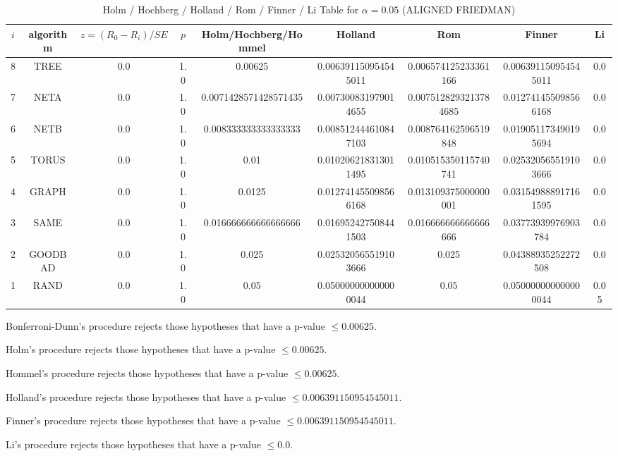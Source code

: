 \documentclass[a4paper,10pt]{article}
\begin{document}
\begin{landscape}
\begin{table}[!htp]
\centering\scriptsize
\caption{Holm / Hochberg / Holland / Rom / Finner / Li Table for $\alpha=0.05$ (ALIGNED FRIEDMAN)}
\begin{tabular}{ccccccccc}
$i$&algorithm&$z=(R_0 - R_i)/SE$&$p$&Holm/Hochberg/Hommel&Holland&Rom&Finner&Li\\
\hline
8& TREE&0.0&1.0&0.00625&0.006391150954545011&0.006574125233361166&0.006391150954545011&0.0\\
7& NETA&0.0&1.0&0.0071428571428571435&0.007300831979014655&0.0075128293213784685&0.012741455098566168&0.0\\
6& NETB&0.0&1.0&0.008333333333333333&0.008512444610847103&0.008764162596519848&0.019051173490195694&0.0\\
5& TORUS&0.0&1.0&0.01&0.010206218313011495&0.010515350115740741&0.025320565519103666&0.0\\
4& GRAPH&0.0&1.0&0.0125&0.012741455098566168&0.013109375000000001&0.031549888917161595&0.0\\
3& SAME&0.0&1.0&0.016666666666666666&0.016952427508441503&0.016666666666666666&0.03773939976903784&0.0\\
2& GOODBAD&0.0&1.0&0.025&0.025320565519103666&0.025&0.04388935252272508&0.0\\
1& RAND&0.0&1.0&0.05&0.050000000000000044&0.05&0.050000000000000044&0.05\\
\hline
\end{tabular}
\end{table}
Bonferroni-Dunn's procedure rejects those hypotheses that have a p-value $\le0.00625$.


Holm's procedure rejects those hypotheses that have a p-value $\le0.00625$.


Hommel's procedure rejects those hypotheses that have a p-value $\le0.00625$.


Holland's procedure rejects those hypotheses that have a p-value $\le0.006391150954545011$.


Finner's procedure rejects those hypotheses that have a p-value $\le0.006391150954545011$.


Li's procedure rejects those hypotheses that have a p-value $\le0.0$.



\newpage


\end{landscape}
\end{document}
